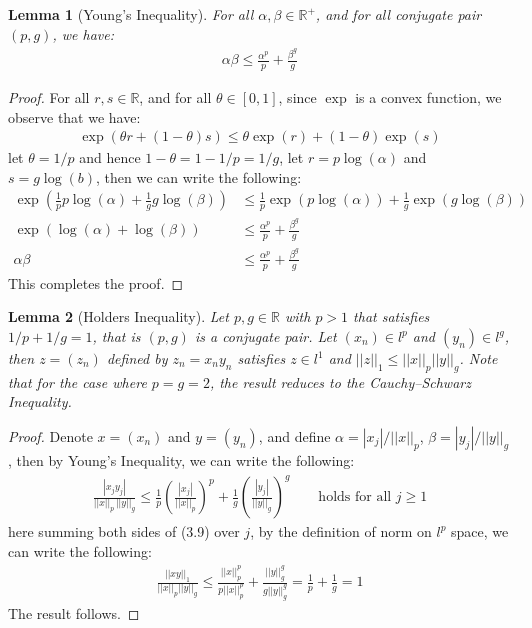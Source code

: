 \documentclass[11pt]{book}
\theoremstyle{break}
\theoremstyle{break}
\newtheorem{lem}{Lemma}[thm]
\newcommand{\R}{\mathbb{R}}
\begin{document}
\begin{lem}[Young's Inequality]
For all $\alpha,\beta \in \R^+$, and for all conjugate pair $(p,g)$, we have:
\begin{align*}
\alpha\beta \leq \frac{\alpha^p}{p} + \frac{\beta^g}{g}
\end{align*}
\end{lem}
\begin{proof}
For all $r,s \in \R$, and for all $\theta\in[0,1]$, since $\exp$ is a convex function, we observe that we have:
\begin{align*}
\exp(\theta r+ (1-\theta)s) \leq \theta\exp(r) + (1-\theta) \exp(s) 
\end{align*}
let $\theta = 1/p$  and hence $1-\theta = 1-1/p = 1/g$, let $r = p\log(\alpha)$ and $s = g\log(b)$, then we can write the following:
\begin{align*}
\exp\left( \frac{1}{p} p \log(\alpha) + \frac{1}{g}g\log(\beta) \right) &\leq \frac{1}{p}\exp\left( p\log(\alpha)\right)+ \frac{1}{g}\exp(g\log(\beta)) \\
\exp(\log(\alpha) + \log(\beta)) &\leq \frac{\alpha^p}{p}+ \frac{\beta^g}{g} \\
\alpha \beta &\leq \frac{\alpha^p}{p}+ \frac{\beta^g}{g}
\end{align*}
This completes the proof.
\end{proof}


\begin{lem}[Holders Inequality]
Let $p,g\in \R$ with $p>1$ that satisfies $1/p + 1/g = 1$, that is $(p,g)$ is a conjugate pair. Let $(x_n) \in l^p$ and $(y_n) \in l^g$, then $z=(z_n)$ defined by $z_n = x_n y_n$ satisfies $z \in l^1$ and $||z||_1 \leq ||x||_p ||y||_g$. Note that for the case where $p=g=2$, the result reduces to the Cauchy–Schwarz Inequality.
\end{lem}
\begin{proof}
Denote $x = (x_n)$ and $y = (y_n)$, and define $\alpha = |x_j| / ||x||_p$, $\beta = |y_j|/||y||_g$, then by Young's Inequality, we can write the following:
\begin{align}
\frac{|x_jy_j|}{||x||_p\, ||y||_g} \leq \frac{1}{p}\left(\frac{|x_j|}{||x||_p} \right)^p + \frac{1}{g} \left( \frac{|y_j|}{||y||_g}\right)^g \qquad \text{holds for all }j\geq 1
\end{align}
here summing both sides of (3.9) over $j$, by the definition of norm on $l^p$ space, we can write the following:
\begin{align*}
\frac{||xy||_1}{||x||_p ||y||_g} \leq \frac{||x||_p^p}{p ||x||_p^p} + \frac{||y||_g^g}{g ||y||_g^g} = \frac{1}{p} + \frac{1}{g} = 1
\end{align*}
The result follows. 
\end{proof}
\end{document}
